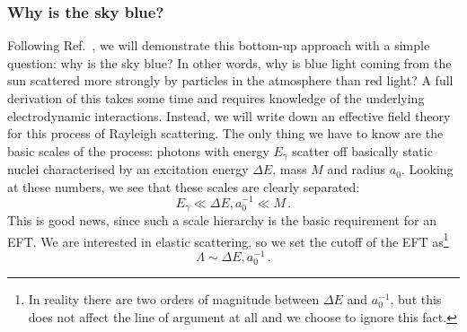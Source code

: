






\subsubsection*{Why is the sky blue?}


Following Ref.~\cite{Kaplan:2005es}, we will demonstrate this
bottom-up approach with a simple question: why is the sky blue?
In other words, why is blue light coming from the sun scattered more
strongly by particles in the atmosphere than red light?  A full
derivation of this takes some time and requires knowledge of the
underlying electrodynamic interactions. Instead, we will write down an
effective field theory for this process of Rayleigh scattering. The
only thing we have to know are the basic scales of the process:
photons with energy $E_\gamma$ scatter off basically static nuclei
characterised by an excitation energy $\Delta E$, mass $M$ and radius
$a_0$. Looking at these numbers, we see that these scales are clearly
separated:
%
\begin{equation}
  E_\gamma \ll \Delta E,  a_0^{-1} \ll M \,.
\end{equation}
%
This is good news, since such a scale hierarchy is the basic
requirement for an EFT. We are interested in elastic scattering, so we
set the cutoff of the EFT as\footnote{In reality there are two orders
  of magnitude between $\Delta E$ and $a_0^{-1}$, but this does not
  affect the line of argument at all and we choose to ignore this
  fact.}
\begin{equation}
  \Lambda \sim \Delta E, a_0^{-1} \,.
\end{equation}

